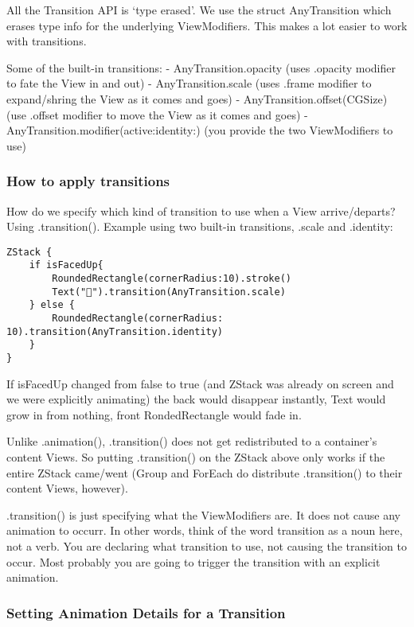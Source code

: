 \documentclass[]{article}
\begin{document}
All the Transition API is `type erased'. We use the struct AnyTransition
which erases type info for the underlying ViewModifiers. This makes a
lot easier to work with transitions.

Some of the built-in transitions: - AnyTransition.opacity (uses .opacity
modifier to fate the View in and out) - AnyTransition.scale (uses .frame
modifier to expand/shring the View as it comes and goes) -
AnyTransition.offset(CGSize) (use .offset modifier to move the View as
it comes and goes) - AnyTransition.modifier(active:identity:) (you
provide the two ViewModifiers to use)

\hypertarget{how-to-apply-transitions}{%
\subsubsection{How to apply
transitions}\label{how-to-apply-transitions}}

How do we specify which kind of transition to use when a View
arrive/departs? Using .transition(). Example using two built-in
transitions, .scale and .identity:

\begin{verbatim}
ZStack {
    if isFacedUp{
        RoundedRectangle(cornerRadius:10).stroke()
        Text("👻").transition(AnyTransition.scale)
    } else {
        RoundedRectangle(cornerRadius: 10).transition(AnyTransition.identity)
    }
}
\end{verbatim}

If isFacedUp changed from false to true (and ZStack was already on
screen and we were explicitly animating) the back would disappear
instantly, Text would grow in from nothing, front RondedRectangle would
fade in.

Unlike .animation(), .transition() does not get redistributed to a
container's content Views. So putting .transition() on the ZStack above
only works if the entire ZStack came/went (Group and ForEach do
distribute .transition() to their content Views, however).

.transition() is just specifying what the ViewModifiers are. It does not
cause any animation to occurr. In other words, think of the word
transition as a noun here, not a verb. You are declaring what transition
to use, not causing the transition to occur. Most probably you are going
to trigger the transition with an explicit animation.

\hypertarget{setting-animation-details-for-a-transition}{%
\subsubsection{Setting Animation Details for a
Transition}\label{setting-animation-details-for-a-transition}}
\end{document}
